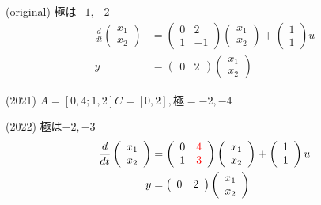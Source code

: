 \documentclass[a4paper,11pt,fleqn]{jreport}
\begin{document}
(original) 極は$-1, -2$
\begin{align*}
	\frac{d}{dt}
	\left (
	\begin{array}{c}
	 x_1 \\ x_2 
	\end{array}
	\right )
	& = 
	\left (
	\begin{array}{cc}
	 0 & 2 \\
	 1 & -1
	\end{array}
	\right )
	\left (
	\begin{array}{c}
	 x_1 \\ x_2 
	\end{array}
	\right )
	+
	\left (
	\begin{array}{c}
	 1 \\ 1 
	\end{array}
	\right )
	u
\\
	y&=
	\left ( \begin{array}{cc}
		0 & 2 
	\end{array} \right )
	\left (	\begin{array}{c}
		x_1 \\ x_2 
	\end{array} \right )
\end{align*}

(2021) $A=[0,4;1,2] C=[0,2], 極=-2,-4$

(2022) 極は{\color{red}$-2, -3$}
\begin{align*}
	\frac{d}{dt}
	\left (
	\begin{array}{c}
	 x_1 \\ x_2 
	\end{array}
	\right )
	& = 
	\left (
	\begin{array}{cc}
	 0 & {\color{red}4} \\
	 1 & {\color{red}3}
	\end{array}
	\right )
	\left (
	\begin{array}{c}
	 x_1 \\ x_2 
	\end{array}
	\right )
	+
	\left (
	\begin{array}{c}
	 1 \\ 1 
	\end{array}
	\right )
	u
\\
	y&=
	\left ( \begin{array}{cc}
		0 & 2 
	\end{array} \right )
	\left (	\begin{array}{c}
		x_1 \\ x_2 
	\end{array} \right )
\end{align*}
\end{document}
